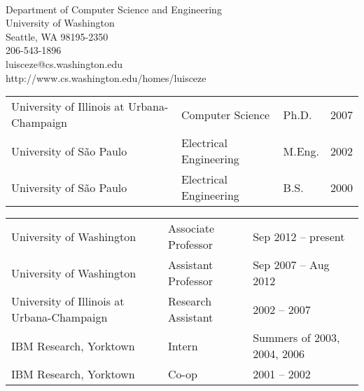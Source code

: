 \newcommand \nextthing {\bigskip}

\\
Department of Computer Science and Engineering\\
University of Washington\\
Seattle, WA 98195-2350\\
206-543-1896\\
luisceze@cs.washington.edu\\
http://www.cs.washington.edu/homes/luisceze



\nextthing
{}

\noindent \begin{tabular}{llll}
University of Illinois at Urbana-Champaign & Computer Science  & Ph.D. & 2007\\
University of S\~{a}o Paulo & Electrical Engineering  & M.Eng. & 2002\\
University of S\~{a}o Paulo & Electrical Engineering  & B.S. & 2000
\end{tabular}


\nextthing
{}

\noindent  \begin{tabular}{lll}
University of Washington &  Associate Professor &  Sep 2012 -- present\\
University of Washington &  Assistant Professor &  Sep 2007 -- Aug 2012\\
University of Illinois at Urbana-Champaign & Research Assistant & 2002 -- 2007 \\
IBM Research, Yorktown & Intern & Summers of 2003, 2004, 2006 \\
IBM Research, Yorktown & Co-op & 2001 -- 2002
\end{tabular}




